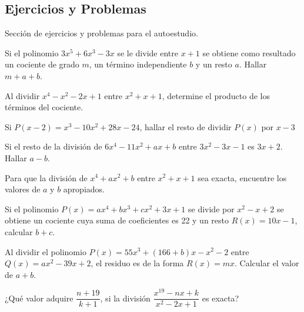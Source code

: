 \subsection{Ejercicios y Problemas}

Sección de ejercicios y problemas para el autoestudio.

\begin{section-problem}
    Si el polinomio $3x^5 + 6x^3 - 3x$ se le divide entre $x + 1$ se obtiene como resultado un cociente de grado $m$, un término independiente $b$ y un resto $a$.
    Hallar $m + a + b$.
\end{section-problem}

\begin{section-problem}
    Al dividir $x^4 - x^2 - 2x + 1$ entre $x^2 + x + 1$, determine el producto de los términos del cociente.
\end{section-problem}

\begin{section-problem}
    Si $P(x - 2) = x^3 - 10x^2 + 28x - 24$, hallar el resto de dividir $P(x)$ por $x - 3$
\end{section-problem}

\begin{section-problem}
    Si el resto de la división de $6x^4 - 11x^2 + ax + b$ entre $3x^2 - 3x - 1$ es $3x + 2$.
    Hallar $a - b$.
\end{section-problem}

\begin{section-problem}
    Para que la división de $x^4 + ax^2 + b$ entre $x^2 + x + 1$ sea exacta, encuentre los valores de $a$ y $b$ apropiados.
\end{section-problem}

\begin{section-problem}
    Si el polinomio $P(x) = ax^4 + bx^3 + cx^2 + 3x + 1$ se divide por $x^2 - x + 2$ se obtiene un cociente cuya suma de coeficientes es 22 y un resto $R(x) = 10x - 1$, calcular $b + c$.
\end{section-problem}

\begin{section-problem}
    Al dividir el polinomio $P(x) = 55x^3 + (166 + b)x - x^2 - 2$ entre $Q(x) = ax^2 - 39x + 2$, el residuo es de la forma $R(x) = mx$. Calcular el valor de $a + b$.
\end{section-problem}

\begin{section-problem}
    ¿Qué valor adquire $\dfrac{n + 19}{k + 1}$, si la división $\dfrac{x^{19} - nx + k}{x^2 - 2x + 1}$ es exacta?
\end{section-problem}
